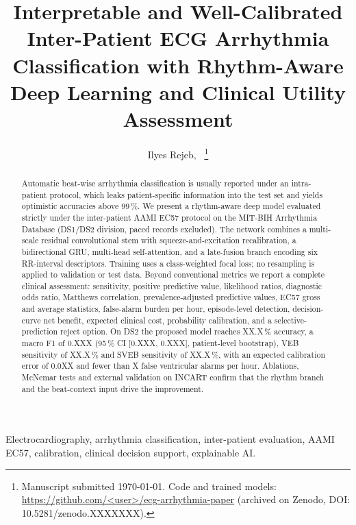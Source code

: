 \documentclass[journal]{IEEEtran}
\begin{document}
\title{Interpretable and Well-Calibrated Inter-Patient ECG Arrhythmia
Classification with Rhythm-Aware Deep Learning and Clinical Utility Assessment}

\author{Ilyes Rejeb,~\IEEEmembership{}
\thanks{Manuscript submitted \today. Code and trained models:
\url{https://github.com/<user>/ecg-arrhythmia-paper} (archived on Zenodo, DOI: 10.5281/zenodo.XXXXXXX).}}

\maketitle

\begin{abstract}
Automatic beat-wise arrhythmia classification is usually reported under an intra-patient
protocol, which leaks patient-specific information into the test set and yields optimistic
accuracies above 99\,\%. We present a rhythm-aware deep model evaluated strictly under the
inter-patient AAMI EC57 protocol on the MIT-BIH Arrhythmia Database (DS1/DS2 division, paced
records excluded). The network combines a multi-scale residual convolutional stem with
squeeze-and-excitation recalibration, a bidirectional GRU, multi-head self-attention, and a
late-fusion branch encoding six RR-interval descriptors. Training uses a class-weighted focal
loss; no resampling is applied to validation or test data. Beyond conventional metrics we report
a complete clinical assessment: sensitivity, positive predictive value, likelihood ratios,
diagnostic odds ratio, Matthews correlation, prevalence-adjusted predictive values, EC57 gross
and average statistics, false-alarm burden per hour, episode-level detection, decision-curve net
benefit, expected clinical cost, probability calibration, and a selective-prediction reject
option. On DS2 the proposed model reaches XX.X\,\% accuracy, a macro F1 of 0.XXX
(95\,\% CI [0.XXX, 0.XXX], patient-level bootstrap), VEB sensitivity of XX.X\,\% and SVEB
sensitivity of XX.X\,\%, with an expected calibration error of 0.0XX and fewer than X false
ventricular alarms per hour. Ablations, McNemar tests and external validation on INCART confirm
that the rhythm branch and the beat-context input drive the improvement.
\end{abstract}

\begin{IEEEkeywords}
Electrocardiography, arrhythmia classification, inter-patient evaluation, AAMI EC57,
calibration, clinical decision support, explainable AI.
\end{IEEEkeywords}
\end{document}
